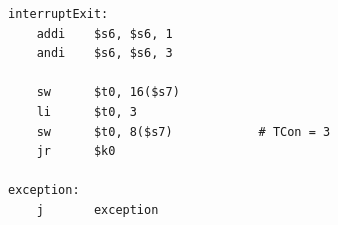 \documentclass[a4paper]{article}
\begin{document}
\begin{verbatim}
interruptExit:
    addi    $s6, $s6, 1
    andi    $s6, $s6, 3

    sw      $t0, 16($s7)
    li      $t0, 3
    sw      $t0, 8($s7)            # TCon = 3
    jr      $k0

exception:
    j       exception


\end{verbatim}
\end{document}
